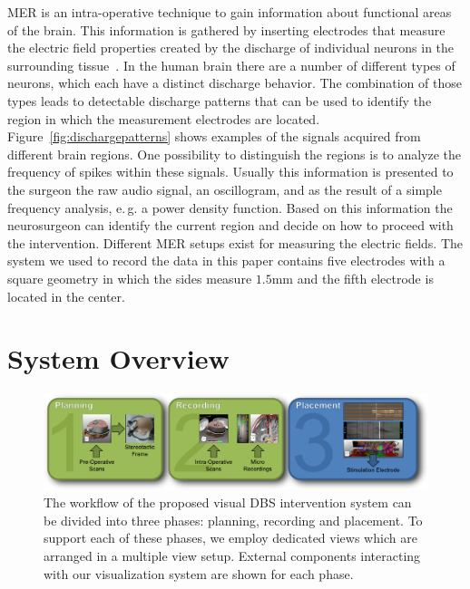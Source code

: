 \documentclass[review]{vgtc}                 %
\begin{document}
MER is an intra-operative technique to gain information about functional areas of the brain. This information is gathered by inserting electrodes that measure the electric field properties created by the discharge of individual neurons in the surrounding tissue~\cite{McIntyre2006}. In the human brain there are a number of different types of neurons, which each have a distinct discharge behavior. The combination of those types leads to detectable discharge patterns that can be used to identify the region in which the measurement electrodes are located. Figure~\ref{fig:dischargepatterns} shows examples of the signals acquired from different brain regions. One possibility to distinguish the regions is to analyze the frequency of spikes within these signals. Usually this information is presented to the surgeon the raw  audio signal, an oscillogram, and as the result of a simple frequency analysis, e.\,g. a power density function. Based on this information the neurosurgeon can identify the current region and decide on how to proceed with the intervention. Different MER setups exist for measuring the electric fields. The system we used to record the data in this paper contains five electrodes with a square geometry in which the sides measure $1.5$mm and the fifth electrode is located in the center.

%
%

\section{System Overview}\label{sec:overview}
\begin{figure}[t]
    \centering
    \includegraphics[width=0.9\linewidth]{figures/workflow}
    \caption{The workflow of the proposed visual DBS intervention system can be divided into three phases: planning, recording and placement. To support each of these phases, we employ dedicated views which are arranged in a multiple view setup. External components interacting with our visualization system are shown for each phase.}
    \label{fig:workflow}
\end{figure}
\end{document}
